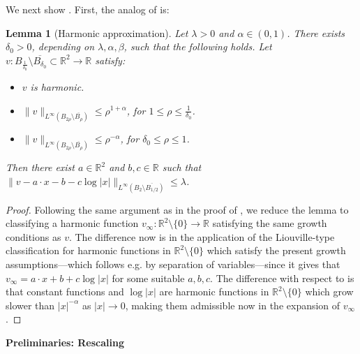 \documentclass{article}
\newcommand{\R}{\mathbb{R}}
\newtheorem{lemma}[theorem]{Lemma}
\theoremstyle{definition}
\begin{document}
We next show . First, the analog of  is:
\begin{lemma}[Harmonic approximation]\label{lincomp2D} Let $\lambda>0$ and $\alpha \in (0,1)$. There exists $\delta_0>0$, depending on $\lambda, \alpha, \beta$, such that the following holds. Let $v:B_{\frac{1}{\delta_0}}\setminus \overline{B_{\delta_0}}\subset \R^2 \to \R$ satisfy:
\begin{itemize}
    \item $v$ is harmonic.
    
    \item $\|v\|_{L^\infty(B_{2\rho}\setminus \overline{B_\rho})}\leq \rho^{1+\alpha}$, for $1\leq\rho\leq\frac{1}{\delta_0}$.
    
    \item $\|v\|_{L^\infty(B_{2\rho}\setminus \overline{B_\rho})}\leq \rho^{-\alpha}$, for $\delta_0\leq\rho\leq 1$.
\end{itemize}
Then there exist $a\in\R^{2}$ and $b,c\in\R$ such that $\|v-a\cdot x-b-c\log |x|\|_{L^\infty(B_{2}\setminus \overline{B_{1/2}})
}\leq \lambda$.
\end{lemma}
\begin{proof}
Following the same argument as in the proof of , we reduce the lemma to classifying a harmonic function $v_\infty:\R^2\setminus\{0\}\to\R$ satisfying the same growth conditions as $v$. The difference now is in the application of the Liouville-type classification for harmonic functions in $\R^2\setminus \{0\}$ which satisfy the present growth assumptions---which follows e.g. by separation of variables---since it gives that $v_\infty=a\cdot x+b+c\log |x|$ for some suitable $a,b,c$. The difference with respect to  is that constant functions and $\log |x|$ are harmonic functions in $\R^2\setminus\{0\}$ which grow slower than $|x|^{-\alpha}$ as $|x|\to 0$, making them admissible now in the expansion of $v_\infty$.
\end{proof}
{\bf Preliminaries: Rescaling}
\end{document}

